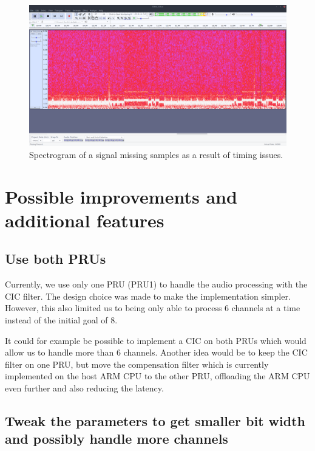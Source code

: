\documentclass[]{report}
\begin{document}
\begin{figure}[H]
\centering
\includegraphics[width=1.0\linewidth]{Pictures/timing_bug.png}
\caption{Spectrogram of a signal missing samples as a result of timing
issues.}
\end{figure}

\hypertarget{possible-improvements-and-additional-features}{%
\chapter{Possible improvements and additional
features}\label{possible-improvements-and-additional-features}}

\hypertarget{use-both-prus}{%
\section{Use both PRUs}\label{use-both-prus}}

Currently, we use only one PRU (PRU1) to handle the audio processing with the CIC filter. The design choice was made to make the implementation simpler. However, this also limited us to being only able to process 6 channels at a time instead of the initial goal of 8.

It could for example be possible to implement a CIC on both PRUs which would allow us to handle more than 6 channels. Another idea would be to keep the CIC filter on one PRU, but move the compensation filter which is currently implemented on the host ARM CPU to the other PRU, offloading the ARM CPU even further and also reducing the latency.

\hypertarget{tweak-the-parameters-to-get-smaller-bit-width-and-possibly-handle-more-channels}{%
\section{Tweak the parameters to get smaller bit width and possibly
handle more
channels}\label{tweak-the-parameters-to-get-smaller-bit-width-and-possibly-handle-more-channels}}
\end{document}
